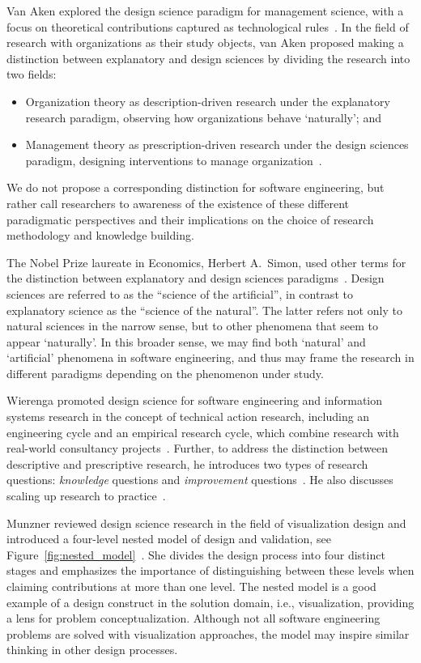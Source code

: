 \documentclass[graybox]{svmult}
\begin{document}
Van Aken explored the design science paradigm for management science, with a focus on theoretical contributions captured as technological rules~\cite{van_aken_management_2004,van_aken_management_2005}. 
In the field of research with organizations as their study objects, van Aken proposed making a distinction between explanatory and design sciences by dividing the research into two fields: 
\begin{itemize}
\item Organization theory as description-driven research under the explanatory research paradigm, observing how organizations behave `naturally'; and 
\item Management theory as prescription-driven research under the design sciences paradigm, designing interventions to manage organization~\cite{van_aken_management_2004}.  
\end{itemize}

We do not propose a corresponding distinction for software engineering, but rather call researchers to awareness of the existence of these different paradigmatic perspectives and their implications on the choice of research methodology and knowledge building.

The Nobel Prize laureate in Economics, Herbert A.\ Simon, used other terms for the distinction between explanatory and design sciences paradigms~\cite{Simons69}. Design sciences are referred to as the ``science of the artificial'', in contrast to explanatory science as the ``science of the natural''. The latter refers not only to natural sciences in the narrow sense, but to other phenomena that seem to appear `naturally'. In this broader sense, we may find both `natural' and `artificial' phenomena in software engineering, and thus may frame the research in different paradigms depending on the phenomenon under study. 


Wierenga promoted design science for software engineering and information systems research in the concept of technical action research, including an engineering cycle and an empirical research cycle, which combine research with real-world consultancy projects~\cite{wieringa_six_2015,wieringa_technical_2012,wieringa_what_2014}. Further, to address the distinction between descriptive and prescriptive research, he introduces two types of research questions: \emph{knowledge} questions and \emph{improvement} questions~\cite{wieringa_design_2009}. He also discusses scaling up research to practice~\cite{Wieringa2014}. 

Munzner reviewed design science research in the field of visualization design and introduced a four-level nested model of design and validation, see Figure~\ref{fig:nested_model}~\cite{munzner2009}. She divides the design process into four distinct stages and emphasizes the importance of distinguishing between these levels when claiming contributions at more than one level. The nested model is a good example of a design construct in the solution domain, i.e., visualization, providing a lens for problem conceptualization. Although not all software engineering problems are solved with visualization approaches, the model may inspire similar thinking in other design processes. 
\end{document}
